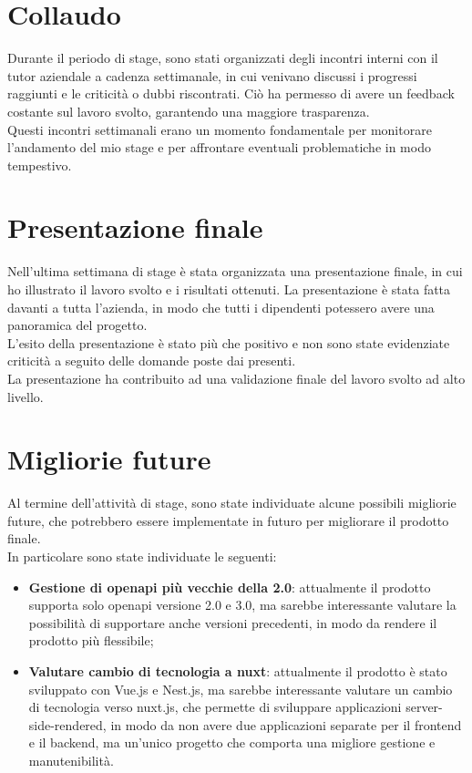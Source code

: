 \section{Collaudo}
Durante il periodo di stage, sono stati organizzati degli incontri interni con il tutor aziendale a cadenza settimanale, in cui venivano discussi i progressi
raggiunti e le criticità o dubbi riscontrati. Ciò ha permesso di avere un feedback costante sul lavoro svolto, garantendo una maggiore trasparenza.\\
Questi incontri settimanali erano un momento fondamentale per monitorare l'andamento del mio stage e per affrontare eventuali problematiche in modo tempestivo.


\section{Presentazione finale}
Nell'ultima settimana di stage è stata organizzata una presentazione finale, in cui ho illustrato il lavoro svolto e i risultati ottenuti.
La presentazione è stata fatta davanti a tutta l'azienda, in modo che tutti i dipendenti potessero avere una panoramica del progetto.\\
L'esito della presentazione è stato più che positivo e non sono state evidenziate criticità a seguito delle domande poste dai presenti.\\
La presentazione ha contribuito ad una validazione finale del lavoro svolto ad alto livello.

\section{Migliorie future}
Al termine dell'attività di stage, sono state individuate alcune possibili migliorie future, che potrebbero essere implementate in futuro per migliorare
il prodotto finale.\\
In particolare sono state individuate le seguenti:
\begin{itemize}
  \item \textbf{Gestione di openapi più vecchie della 2.0}: attualmente il prodotto supporta solo openapi versione 2.0 e 3.0, ma sarebbe interessante valutare la possibilità di supportare anche versioni precedenti, in modo da rendere il prodotto più flessibile;
  \item \textbf{Valutare cambio di tecnologia a nuxt}: attualmente il prodotto è stato sviluppato con Vue.js e Nest.js, ma sarebbe interessante valutare un cambio di tecnologia verso nuxt.js, che permette di sviluppare applicazioni server-side-rendered, 
  in modo da non avere due applicazioni separate per il frontend e il backend, ma un'unico progetto che comporta una migliore gestione e manutenibilità.
\end{itemize}








